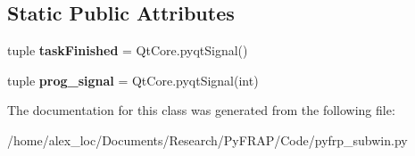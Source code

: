 \subsection*{Static Public Attributes}
\begin{DoxyCompactItemize}
\item 
\hypertarget{classpyfrp__subwin_1_1simulation__thread_acaefa646cabdcd360614eacb624c74ec}{tuple {\bfseries task\+Finished} = Qt\+Core.\+pyqt\+Signal()}\label{classpyfrp__subwin_1_1simulation__thread_acaefa646cabdcd360614eacb624c74ec}

\item 
\hypertarget{classpyfrp__subwin_1_1simulation__thread_a8fcdacdbced51ca71d10117d393179f0}{tuple {\bfseries prog\+\_\+signal} = Qt\+Core.\+pyqt\+Signal(int)}\label{classpyfrp__subwin_1_1simulation__thread_a8fcdacdbced51ca71d10117d393179f0}

\end{DoxyCompactItemize}


The documentation for this class was generated from the following file\+:\begin{DoxyCompactItemize}
\item 
/home/alex\+\_\+loc/\+Documents/\+Research/\+Py\+F\+R\+A\+P/\+Code/pyfrp\+\_\+subwin.\+py\end{DoxyCompactItemize}
